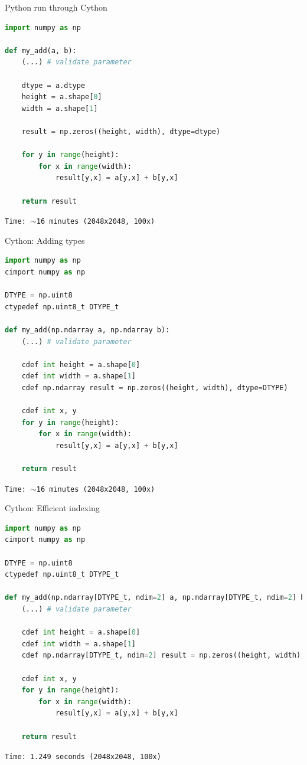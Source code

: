 \documentclass[dvipsnames]{beamer}
\begin{document}
\begin{frame}[fragile]{Python run through Cython}
\begin{lstlisting}[language=Python,caption={add2.pyx}]
import numpy as np

def my_add(a, b):
    (...) # validate parameter
	
    dtype = a.dtype
    height = a.shape[0]
    width = a.shape[1]

    result = np.zeros((height, width), dtype=dtype)

    for y in range(height):
        for x in range(width):
            result[y,x] = a[y,x] + b[y,x]

    return result
\end{lstlisting}
\pause
{\tt Time: $\sim$16 minutes (2048x2048, 100x)}
\end{frame}

\begin{frame}[fragile]{Cython: Adding types}

\begin{lstlisting}[language=Python,caption={add3.pyx}]
import numpy as np
cimport numpy as np

DTYPE = np.uint8
ctypedef np.uint8_t DTYPE_t

def my_add(np.ndarray a, np.ndarray b):
    (...) # validate parameter

    cdef int height = a.shape[0]
    cdef int width = a.shape[1]
    cdef np.ndarray result = np.zeros((height, width), dtype=DTYPE)

    cdef int x, y
    for y in range(height):
        for x in range(width):
            result[y,x] = a[y,x] + b[y,x]

    return result
\end{lstlisting}
\pause
\vspace{-0.2cm}
{\tt Time: $\sim$16 minutes (2048x2048, 100x)}
\end{frame}

\begin{frame}[fragile]{Cython: Efficient indexing}
\begin{lstlisting}[language=Python,caption={add4.pyx}]
import numpy as np
cimport numpy as np

DTYPE = np.uint8
ctypedef np.uint8_t DTYPE_t

def my_add(np.ndarray[DTYPE_t, ndim=2] a, np.ndarray[DTYPE_t, ndim=2] b):
    (...) # validate parameter

    cdef int height = a.shape[0]
    cdef int width = a.shape[1]
    cdef np.ndarray[DTYPE_t, ndim=2] result = np.zeros((height, width), dtype=DTYPE)

    cdef int x, y
    for y in range(height):
        for x in range(width):
            result[y,x] = a[y,x] + b[y,x]

    return result
\end{lstlisting}
\pause
\vspace{-0.3cm}
{\tt Time: 1.249 seconds (2048x2048, 100x)}
\end{frame}
\end{document}
